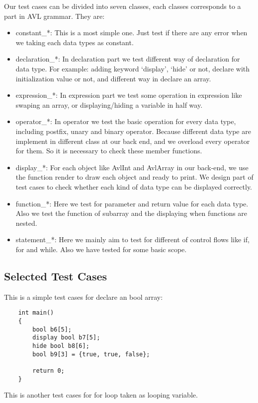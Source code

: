 Our test cases can be divided into seven classes, each classes corresponds to a part in AVL grammar.
They are:
\begin{itemize}
\item constant\_*: 
This is a most simple one. Just test if there are any error when we taking each data types as
constant.
\item declaration\_*:
In declaration part we test different way of declaration for data type. For example: adding keyword
‘display’, ‘hide’ or not, declare with initialization value or not, and different way in declare an
array.
\item expression\_*:
In expression part we test some operation in expression like swaping an array, or displaying/hiding
a variable in half way.
\item operator\_*:
In operator we test the basic operation for every data type, including postfix, unary and binary
operator. Because different data type are implement in different class at our back end, and we
overload every operator for them. So it is necessary to check these member functions.
\item display\_*:
For each object like AvlInt and AvlArray in our back-end, we use the function render to draw each
object and ready to print. We design part of test cases to check whether each kind of data type can
be displayed correctly.
\item function\_*: 
Here we test for parameter and return value for each data type. Also we test the function of
subarray and the displaying when functions are nested.
\item statement\_*:
Here we mainly aim to test for different of control flows like if, for and while. Also we have
tested for some basic scope.
\end{itemize}

\subsection{Selected Test Cases}

This is a simple test cases for declare an bool array:

\begin{verbatim}
    int main()
    {
        bool b6[5];
        display bool b7[5];
        hide bool b8[6];
        bool b9[3] = {true, true, false};

        return 0;
    }
\end{verbatim}

This is another test cases for for loop taken as looping variable.

